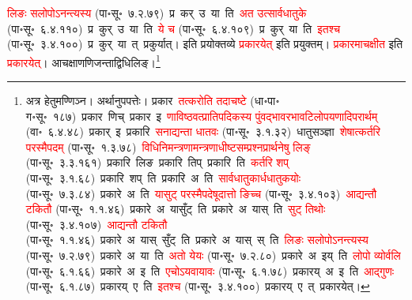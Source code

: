 \begin{sloppypar}
{\textcolor{red}{लिङः सलोपोऽनन्त्यस्य} (पा॰सू॰~७.२.७९)~\arrow प्र~कर्~उ~या~ति~\arrow \textcolor{red}{अत उत्सार्वधातुके} (पा॰सू॰~६.४.११०)~\arrow प्र~कुर्~उ~या~ति~\arrow \textcolor{red}{ये च} (पा॰सू॰~६.४.१०९)~\arrow प्र~कुर्~या~ति~\arrow \textcolor{red}{इतश्च} (पा॰सू॰~३.४.१००)~\arrow प्र~कुर्~या~त्~\arrow प्रकुर्यात्।} इति प्रयोक्तव्ये \textcolor{red}{प्रकारयेत्} इति प्रयुक्तम्। \textcolor{red}{प्रकारमाचक्षीत} इति \textcolor{red}{प्रकारयेत्}। आचक्षाण\-णिजन्ताद्विधि\-लिङ्।\footnote{अत्र हेतुमण्णिञ्न। अर्थानुपपत्तेः। प्रकार~\arrow \textcolor{red}{तत्करोति तदाचष्टे} (धा॰पा॰ ग॰सू॰~१८७)~\arrow प्रकार~णिच्~\arrow प्रकार~इ~\arrow \textcolor{red}{णाविष्ठवत्प्राति\-पदिकस्य पुंवद्भाव\-रभाव\-टिलोप\-यणादि\-परार्थम्} (वा॰~६.४.४८)~\arrow प्रकार्~इ~\arrow प्रकारि~\arrow \textcolor{red}{सनाद्यन्ता धातवः} (पा॰सू॰~३.१.३२)~\arrow धातुसञ्ज्ञा~\arrow \textcolor{red}{शेषात्कर्तरि परस्मैपदम्} (पा॰सू॰~१.३.७८)~\arrow \textcolor{red}{विधि\-निमन्‍त्रणामन्‍त्रणाधीष्‍ट\-सम्प्रश्‍न\-प्रार्थनेषु लिङ्} (पा॰सू॰~३.३.१६१)~\arrow प्रकारि~लिङ~\arrow प्रकारि~तिप्~\arrow प्रकारि~ति~\arrow \textcolor{red}{कर्तरि शप्‌} (पा॰सू॰~३.१.६८)~\arrow प्रकारि~शप्~ति~\arrow प्रकारि~अ~ति~\arrow \textcolor{red}{सार्वधातुकार्ध\-धातुकयोः} (पा॰सू॰~७.३.८४)~\arrow प्रकारे~अ~ति~\arrow \textcolor{red}{यासुट् परस्मैपदेषूदात्तो ङिच्च} (पा॰सू॰~३.४.१०३)~\arrow \textcolor{red}{आद्यन्तौ टकितौ} (पा॰सू॰~१.१.४६)~\arrow प्रकारे~अ~यासुँट्~ति~\arrow प्रकारे~अ~यास्~ति~\arrow \textcolor{red}{सुट् तिथोः} (पा॰सू॰~३.४.१०७)~\arrow \textcolor{red}{आद्यन्तौ टकितौ} (पा॰सू॰~१.१.४६)~\arrow प्रकारे~अ~यास्~सुँट्~ति~\arrow प्रकारे~अ~यास्~स्~ति~\arrow \textcolor{red}{लिङः सलोपोऽनन्त्यस्य} (पा॰सू॰~७.२.७९)~\arrow प्रकारे~अ~या~ति~\arrow \textcolor{red}{अतो येयः} (पा॰सू॰~७.२.८०)~\arrow प्रकारे~अ~इय्~ति~\arrow \textcolor{red}{लोपो व्योर्वलि} (पा॰सू॰~६.१.६६)~\arrow प्रकारे~अ~इ~ति~\arrow \textcolor{red}{एचोऽयवायावः} (पा॰सू॰~६.१.७८)~\arrow प्रकारय्~अ~इ~ति~\arrow \textcolor{red}{आद्गुणः} (पा॰सू॰~६.१.८७)~\arrow प्रकारय्~ए~ति~\arrow \textcolor{red}{इतश्च} (पा॰सू॰~३.४.१००)~\arrow प्रकारय्~ए~त्~\arrow प्रकारयेत्।}\end{sloppypar}
